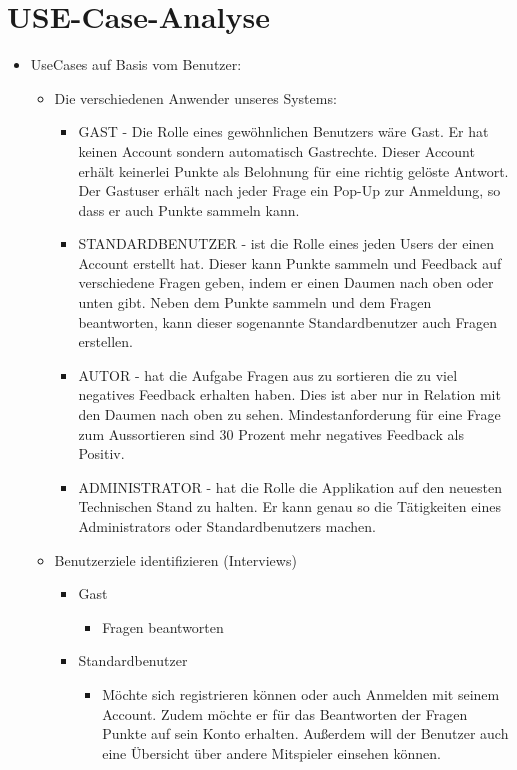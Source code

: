 \section{USE-Case-Analyse}
\begin{itemize}
	\item UseCases auf Basis vom Benutzer: 
	\begin{itemize}
		\item Die verschiedenen Anwender unseres Systems:
			\begin{itemize}
				\item GAST - Die Rolle eines gewöhnlichen Benutzers wäre Gast. Er hat keinen Account sondern automatisch Gastrechte. Dieser Account erhält keinerlei Punkte als Belohnung für eine richtig gelöste Antwort. Der Gastuser erhält nach jeder Frage ein Pop-Up zur Anmeldung, so dass er auch Punkte sammeln kann. 
				\item STANDARDBENUTZER - ist die Rolle eines jeden Users der einen Account erstellt hat. Dieser kann Punkte sammeln und Feedback auf verschiedene Fragen geben, indem er einen Daumen nach oben oder unten gibt. Neben dem Punkte sammeln und dem Fragen beantworten, kann dieser sogenannte Standardbenutzer auch Fragen erstellen.
				\item AUTOR - hat die Aufgabe Fragen aus zu sortieren die zu viel negatives Feedback erhalten haben. Dies ist aber nur in Relation mit den Daumen nach oben zu sehen. Mindestanforderung für eine Frage zum Aussortieren sind 30 Prozent mehr negatives Feedback als Positiv. 
				\item ADMINISTRATOR - hat die Rolle die Applikation auf den neuesten Technischen Stand zu halten. Er kann genau so die Tätigkeiten eines Administrators oder Standardbenutzers machen. 
			\end{itemize} 
		\item Benutzerziele identifizieren (Interviews)
			\begin{itemize}
				\item Gast
					\begin{itemize}
						\item Fragen beantworten
					\end{itemize}
				\item Standardbenutzer
					\begin{itemize}
						\item Möchte sich registrieren können oder auch Anmelden mit seinem Account. Zudem möchte er für das Beantworten der Fragen Punkte auf sein Konto erhalten. Außerdem will der Benutzer auch eine Übersicht über andere Mitspieler einsehen können. 

\end{itemize}
\end{itemize}
\end{itemize}
\end{itemize}
